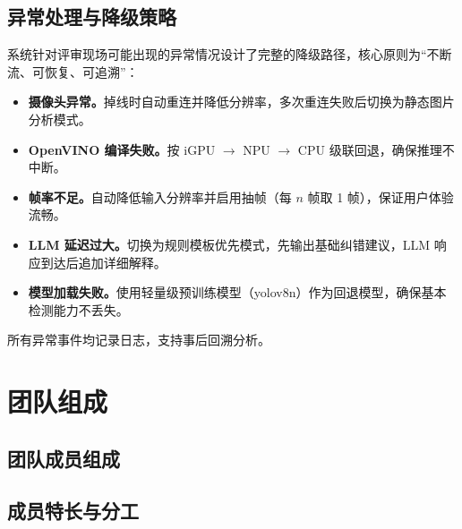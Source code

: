 \documentclass[a4paper,12pt,fontset=ubuntu]{ctexart}
\begin{document}
\subsection{异常处理与降级策略}

系统针对评审现场可能出现的异常情况设计了完整的降级路径，核心原则为“不断流、可恢复、可追溯”：

\begin{itemize}
    \item \textbf{摄像头异常。}掉线时自动重连并降低分辨率，多次重连失败后切换为静态图片分析模式。
    \item \textbf{OpenVINO 编译失败。}按 iGPU $\rightarrow$ NPU $\rightarrow$ CPU 级联回退，确保推理不中断。
    \item \textbf{帧率不足。}自动降低输入分辨率并启用抽帧（每 $n$ 帧取 1 帧），保证用户体验流畅。
    \item \textbf{LLM 延迟过大。}切换为规则模板优先模式，先输出基础纠错建议，LLM 响应到达后追加详细解释。
    \item \textbf{模型加载失败。}使用轻量级预训练模型（yolov8n）作为回退模型，确保基本检测能力不丢失。
\end{itemize}

所有异常事件均记录日志，支持事后回溯分析。


\section{团队组成}
\label{sec:team}

\subsection{团队成员组成}


\subsection{成员特长与分工}

\end{document}
